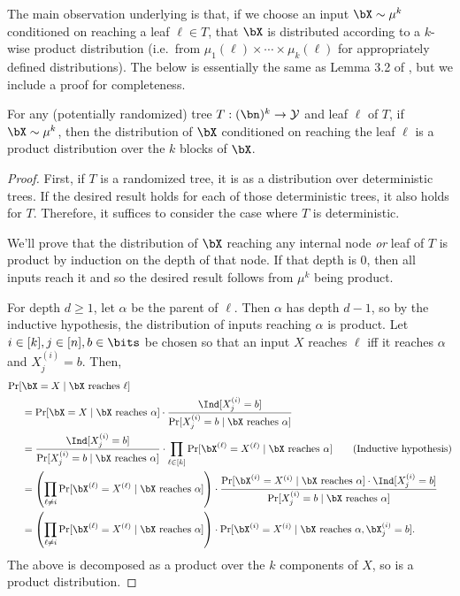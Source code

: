 \documentclass[11pt]{article}
\newcommand{\mcY}{\mathcal Y}
\DeclarePairedDelimiter\paren{(}{)}
\begin{document}
The main observation underlying  is that, if we choose an input $\bX \sim \mu^k$ conditioned on reaching a leaf $\ell \in T$, that $\bX$ is distributed according to a $k$-wise product distribution (i.e.~from $\mu_1(\ell) \times \cdots \times \mu_k(\ell)$ for appropriately defined distributions). The below is essentially the same as  Lemma 3.2 of \cite{Dru12}, but we include a proof for completeness.
\begin{claim}
    \label{claim:leaf-product}
    For any (potentially randomized) tree $T:(\bn)^k \to \mcY$ and leaf $\ell$ of $T$, if $\bX \sim \mu^k$, then the distribution of $\bX$ conditioned on reaching the leaf $\ell$ is a product distribution over the $k$ blocks of $\bX$.
\end{claim}
\begin{proof}
    First, if $T$ is a randomized tree, it is as a distribution over deterministic trees. If the desired result holds for each of those deterministic trees, it also holds for $T$. Therefore, it suffices to consider the case where $T$ is deterministic.

    We'll prove that the distribution of $\bX$ reaching any internal node \emph{or} leaf of $T$ is product by induction on the depth of that node. If that depth is $0$, then all inputs reach it and so the desired result follows from $\mu^k$ being product.

    For depth $d \geq 1$, let $\alpha$ be the parent of $\ell$. Then $\alpha$ has depth $d-1$, so by the inductive hypothesis, the distribution of inputs reaching $\alpha$ is product. Let $i \in [k], j \in [n], b \in \bits$ be chosen so that an input $X$ reaches $\ell$ iff it reaches $\alpha$ and $X^{(i)}_j = b$. Then,
    \begin{align*}
        \Pr[&\bX =X \mid \bX \text{ reaches } \ell] \\
        &= \Pr[\bX =X\mid \bX \text{ reaches } \alpha] \cdot \frac{\Ind[X^{(i)}_j = b]}{\Pr[X^{(i)}_j=b \mid \bX \text{ reaches } \alpha]} \\
         &= \frac{\Ind[X^{(i)}_j = b]}{\Pr[X^{(i)}_j =b\mid \bX \text{ reaches } \alpha]} \cdot \prod_{\ell \in [k]}  \Pr[\bX^{(\ell)} =X^{(\ell)}\mid \bX \text{ reaches } \alpha] \tag{Inductive hypothesis}\\
         &= \paren*{\prod_{\ell \neq i}  \Pr[\bX^{(\ell)} =X^{(\ell)}\mid \bX \text{ reaches } \alpha]} \cdot \frac{\Pr[\bX^{(i)} =X^{(i)}\mid \bX \text{ reaches } \alpha] \cdot \Ind[X^{(i)}_j = b]}{\Pr[X^{(i)}_j =b\mid \bX \text{ reaches } \alpha]}\\
         &= \paren*{\prod_{\ell \neq i}  \Pr[\bX^{(\ell)} =X^{(\ell)}\mid \bX \text{ reaches } \alpha]} \cdot \Pr[\bX^{(i)} =X^{(i)}\mid \bX \text{ reaches } \alpha, \bX^{(i)}_j = b].
    \end{align*}
    The above is decomposed as a product over the $k$ components of $X$, so is a product distribution.
\end{proof}
\end{document}
